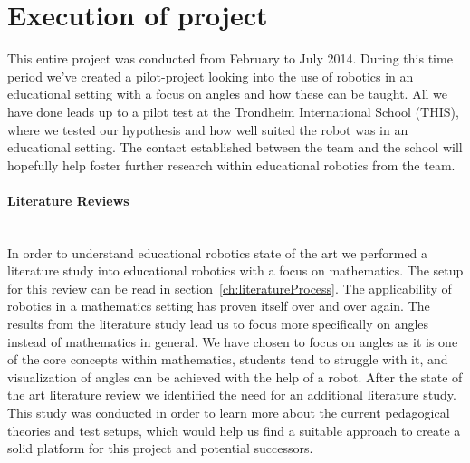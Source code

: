 \section{Execution of project}
This entire project was conducted from February to July 2014. During this time period we've created a pilot-project looking into the use of robotics in an educational setting with a focus on angles and how these can be taught.
All we have done leads up to a pilot test at the Trondheim International School (THIS), where we tested our hypothesis and how well suited the \chirp robot was in an educational setting. 
The contact established between the \chirp team and the school will hopefully help foster further research within educational robotics from the \chirp team.
%

\paragraph{Literature Reviews}~\\	
In order to understand educational robotics state of the art we performed a literature study into educational robotics with a focus on mathematics. The setup for this review can be read in section~\ref{ch:literatureProcess}.
The applicability of robotics in a mathematics setting has proven itself over and over again. The results from the literature study lead us to focus more specifically on angles instead of mathematics in general.
We have chosen to focus on angles as it is one of the core concepts within mathematics, students tend to struggle with it, and visualization of angles can be achieved with the help of a robot.
After the state of the art literature review we identified the need for an additional literature study. This study was conducted in order to learn more about the current pedagogical theories and test setups, which would help us find a suitable approach to create a solid platform for this project and potential successors. 
%


